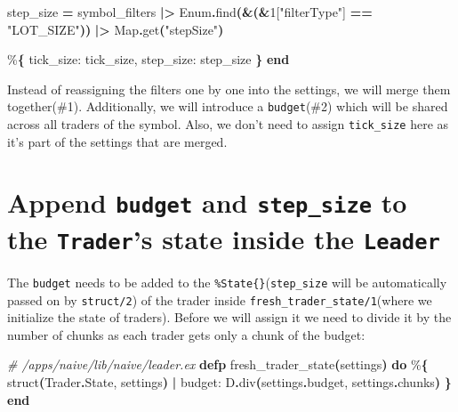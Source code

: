 \documentclass[
  oneside]{book}
\newenvironment{Shaded}{\begin{snugshade}}{\end{snugshade}}
\newcommand{\CommentTok}[1]{\textcolor[rgb]{0.56,0.35,0.01}{\textit{#1}}}
\newcommand{\ConstantTok}[1]{\textcolor[rgb]{0.56,0.35,0.01}{#1}}
\newcommand{\DecValTok}[1]{\textcolor[rgb]{0.00,0.00,0.81}{#1}}
\newcommand{\FunctionTok}[1]{\textcolor[rgb]{0.13,0.29,0.53}{\textbf{#1}}}
\newcommand{\KeywordTok}[1]{\textcolor[rgb]{0.13,0.29,0.53}{\textbf{#1}}}
\newcommand{\NormalTok}[1]{#1}
\newcommand{\OperatorTok}[1]{\textcolor[rgb]{0.81,0.36,0.00}{\textbf{#1}}}
\newcommand{\OtherTok}[1]{\textcolor[rgb]{0.56,0.35,0.01}{#1}}
\newcommand{\StringTok}[1]{\textcolor[rgb]{0.31,0.60,0.02}{#1}}
\newcommand{\VariableTok}[1]{\textcolor[rgb]{0.00,0.00,0.00}{#1}}
\begin{document}
\begin{Shaded}
\begin{Highlighting}[]
\NormalTok{    step\_size }\OperatorTok{=}
\NormalTok{      symbol\_filters}
      \OperatorTok{|\textgreater{}} \ConstantTok{Enum}\OperatorTok{.}\NormalTok{find}\FunctionTok{(}\OperatorTok{\&}\FunctionTok{(}\OperatorTok{\&}\DecValTok{1}\OtherTok{[}\StringTok{"filterType"}\OtherTok{]} \OperatorTok{==} \StringTok{"LOT\_SIZE"}\FunctionTok{))}
      \OperatorTok{|\textgreater{}} \ConstantTok{Map}\OperatorTok{.}\NormalTok{get}\FunctionTok{(}\StringTok{"stepSize"}\FunctionTok{)}

\NormalTok{    \%}\FunctionTok{\{}
      \VariableTok{tick\_size:}\NormalTok{ tick\_size,}
      \VariableTok{step\_size:}\NormalTok{ step\_size}
    \FunctionTok{\}}
  \KeywordTok{end}
\end{Highlighting}
\end{Shaded}

Instead of reassigning the filters one by one into the settings, we will merge them together(\#1). Additionally, we will introduce a \texttt{budget}(\#2) which will be shared across all traders of the symbol. Also, we don't need to assign \texttt{tick\_size} here as it's part of the settings that are merged.

\newpage

\section{\texorpdfstring{Append \texttt{budget} and \texttt{step\_size} to the \texttt{Trader}'s state inside the \texttt{Leader}}{Append budget and step\_size to the Trader's state inside the Leader}}\label{append-budget-and-step_size-to-the-traders-state-inside-the-leader}

The \texttt{budget} needs to be added to the \texttt{\%State\{\}}(\texttt{step\_size} will be automatically passed on by \texttt{struct/2}) of the trader inside \texttt{fresh\_trader\_state/1}(where we initialize the state of traders). Before we will assign it we need to divide it by the number of chunks as each trader gets only a chunk of the budget:

\begin{Shaded}
\begin{Highlighting}[]
  \CommentTok{\# /apps/naive/lib/naive/leader.ex}
  \KeywordTok{defp}\NormalTok{ fresh\_trader\_state}\FunctionTok{(}\NormalTok{settings}\FunctionTok{)} \KeywordTok{do}
\NormalTok{    \%}\FunctionTok{\{}
\NormalTok{      struct}\FunctionTok{(}\ConstantTok{Trader}\OperatorTok{.}\ConstantTok{State}\NormalTok{, settings}\FunctionTok{)}
      \OperatorTok{|} \VariableTok{budget:}\NormalTok{ D}\OperatorTok{.}\NormalTok{div}\FunctionTok{(}\NormalTok{settings}\OperatorTok{.}\NormalTok{budget, settings}\OperatorTok{.}\NormalTok{chunks}\FunctionTok{)}
    \FunctionTok{\}}
  \KeywordTok{end}
\end{Highlighting}
\end{Shaded}
\end{document}
